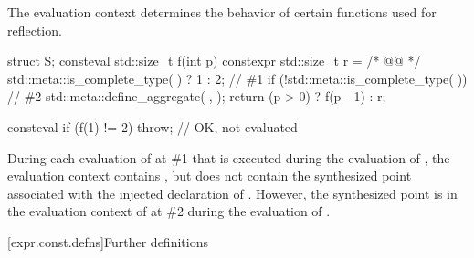 \begin{note}
The evaluation context determines the behavior of certain functions
used for reflection.
\end{note}
\begin{example}
\begin{codeblock}
struct S;
consteval std::size_t f(int p) {
  constexpr std::size_t r = /* @@ */
    std::meta::is_complete_type(^^S) ? 1 : 2;   // \#1
  if (!std::meta::is_complete_type(^^S)) {      // \#2
    std::meta::define_aggregate(^^S, {});
  }
  return (p > 0) ? f(p - 1) : r;
}

consteval {
  if (f(1) != 2) {
    throw;                                      // OK, not evaluated
  }
}
\end{codeblock}
During each evaluation of
at \#1 that is
executed during the evaluation of ,
the evaluation context contains ,
but does not contain the synthesized point
associated with the injected declaration of .
However, the synthesized point is in the evaluation context of
 at \#2
during the evaluation of .
\end{example}

[expr.const.defns]{Further definitions}

